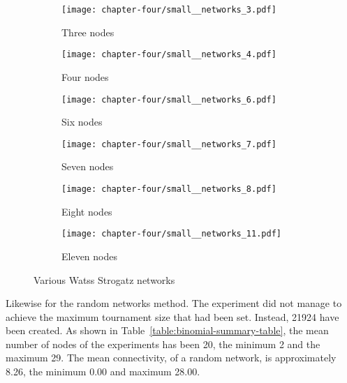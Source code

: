 \begin{figure}[!hbtp]
	\centering
	\begin{subfigure}[t]{0.30\textwidth}
		\centering
		\texttt{[image: chapter-four/small\_\_networks\_3.pdf]}
		\caption{Three nodes}
	\end{subfigure}
	\hfill
	\begin{subfigure}[t]{0.30\textwidth}\centering
		\centering
		\texttt{[image: chapter-four/small\_\_networks\_4.pdf]}
		\caption{Four nodes}
	\end{subfigure}
	\hfill
	\begin{subfigure}[t]{0.30\textwidth}\centering
		\centering
		\texttt{[image: chapter-four/small\_\_networks\_6.pdf]}
		\caption{Six nodes}
	\end{subfigure}
	\hfill
	\begin{subfigure}[t]{0.30\textwidth}\centering
		\centering
		\texttt{[image: chapter-four/small\_\_networks\_7.pdf]}
		\caption{Seven nodes}
	\end{subfigure}
	\hfill
	\begin{subfigure}[t]{0.30\textwidth}\centering
		\centering
		\texttt{[image: chapter-four/small\_\_networks\_8.pdf]}
		\caption{Eight nodes}
	\end{subfigure}
	\hfill
	\begin{subfigure}[t]{0.30\textwidth}\centering
		\centering
		\texttt{[image: chapter-four/small\_\_networks\_11.pdf]}
		\caption{Eleven nodes}
	\end{subfigure}
	\caption{Various Watss Strogatz networks}
	\label{fig:small_networks_illustration}
\end{figure}

Likewise for the random networks method. The experiment did not manage to
achieve the maximum tournament size that had been set. Instead, 21924 have been
created. As shown in Table~\ref{table:binomial-summary-table}, the mean number
of nodes of the experiments has been 20, the minimum 2 and the maximum 29. The
mean connectivity, of a random network, is approximately 8.26, the minimum
0.00 and maximum 28.00.

